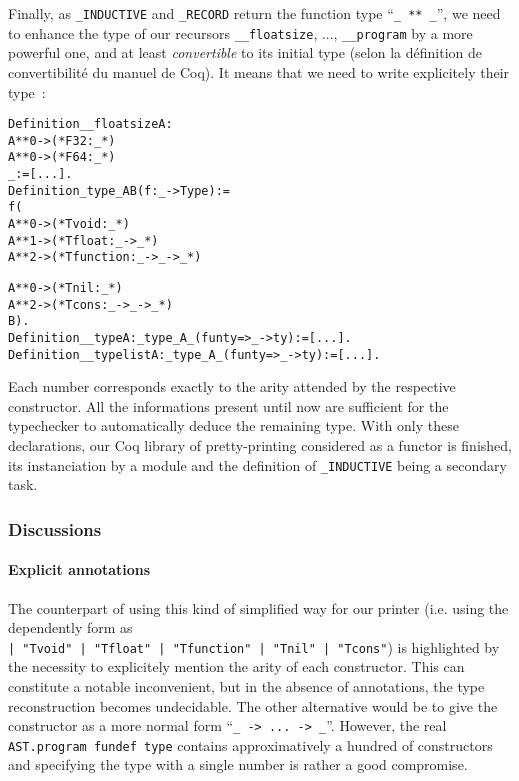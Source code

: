 \documentclass[a4paper, 11pt]{article}
\newenvironment{coq}
  {%
   \begin{alltt}} %% 8.3pl1 (January 2011)
  {\end{alltt} %
  }
\begin{document}
Finally, as \verb|_INDUCTIVE| and \verb|_RECORD| return the function type ``\verb|_ ** _|'', we need to enhance the type of our recursors \verb|__floatsize|, ..., \verb|__program| by a more powerful one, and at least \emph{convertible} to its initial type (selon la définition de convertibilité du manuel de Coq). It means that we need to write explicitely their type~:
\begin{coq}
Definition __floatsize {A} : 
    A ** 0 ->                (* F32       :           _ *)
    A ** 0 ->                (* F64       :           _ *)
    _ := [...].
Definition _type_ A B (f : _ -> Type) := 
  f (
    A ** 0 ->                (* Tvoid     :           _ *)
    A ** 1 ->                (* Tfloat    : _ ->      _ *)
    A ** 2 ->                (* Tfunction : _ -> _ -> _ *)

    A ** 0 ->                (* Tnil      :           _ *)
    A ** 2 ->                (* Tcons     : _ -> _ -> _ *)
  B).
Definition __type {A} : _type_ A _ (fun ty => _ -> ty) := [...].
Definition __typelist {A} : _type_ A _ (fun ty => _ -> ty) := [...].
\end{coq}
Each number corresponds exactly to the arity attended by the respective constructor.
All the informations present until now are sufficient for the typechecker to automatically deduce the remaining type. With only these declarations, our Coq library of pretty-printing considered as a functor is finished, its instanciation by a module and the definition of \verb|_INDUCTIVE| being a secondary task.
\subsubsection{Discussions}
\paragraph{Explicit annotations}
The counterpart of using this kind of simplified way for our printer (i.e. using the dependently form as \\ 
\verb_| "Tvoid" | "Tfloat" | "Tfunction" | "Tnil" | "Tcons"_) is highlighted by the necessity to explicitely mention the arity of each constructor. This can constitute a notable inconvenient, but in the absence of annotations, the type reconstruction becomes undecidable.
The other alternative would be to give the constructor as a more normal form ``\verb|_ -> ... -> _|''. However, the real \verb|AST.program fundef type| contains approximatively a hundred of constructors and specifying the type with a single number is rather a good compromise.
\end{document}
